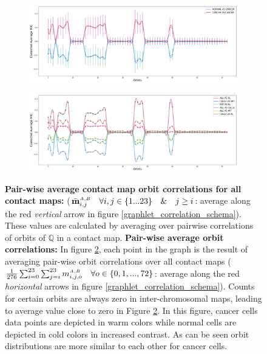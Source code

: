 \documentclass[a4,center,fleqn]{NAR}
\begin{document}
\begin{figure}
    \begin{subfigure}[b]{\textwidth}
        \includegraphics[width=\textwidth]{figures/orbits_correlations_cancer_vs_normal.png}
    \caption{}
    \label{fig:orbits_correlations_normal_vs_cancer}
    \end{subfigure}
    \begin{subfigure}[b]{\textwidth}
    \includegraphics[width=\textwidth]{figures/orbits_correlations_all.png}
    \caption{}
    \label{fig:orbits_correlations_all}
    \end{subfigure}
    \caption{
        \textbf{Pair-wise 
        average contact map orbit correlations
        for all contact maps:}
        ($\bar{\mathbf{m}}^{\scriptscriptstyle \scriptscriptstyle A,B}_{i,j} 
        \quad \forall i,j \in \{1 ... 23\} \quad \& \quad j \ge i$:
        average along the 
        red \textit{vertical} arrow in figure 
        \ref{graphlet_correlation_schema}).
        These values are calculated by averaging over 
        pairwise correlations of orbits of
        $\mathbb{Q}$ in a contact map.
        \textbf{Pair-wise average orbit correlations:}
        In figure \ref{fig:orbits_correlations_all}, each point
        in the graph is the result of averaging pair-wise
        orbit correlations over all contact maps
        ($\frac{1}{276}\sum_{i=0}^{23}\sum_{j=i}^{23}{
        m^{\scriptscriptstyle \scriptscriptstyle A,B}_{i,j, o}} \quad 
        \forall o \in \{0, 1, ..., 72\}$:
        average along the red \textit{horizontal} arrows in figure 
        \ref{graphlet_correlation_schema}).
        Counts for certain orbits are always zero in inter-chromosomal
        maps, leading to average value close to zero in 
        Figure \ref{fig:orbits_correlations_all}.
        In this figure, cancer cells data points are depicted
        in warm colors while normal cells are depicted in
        cold colors in increased contrast. As can be seen
        orbit distributions are more similar to each other
        for cancer cells.
    }
    \label{fig:orbits_correlations}
\end{figure}
\end{document}

